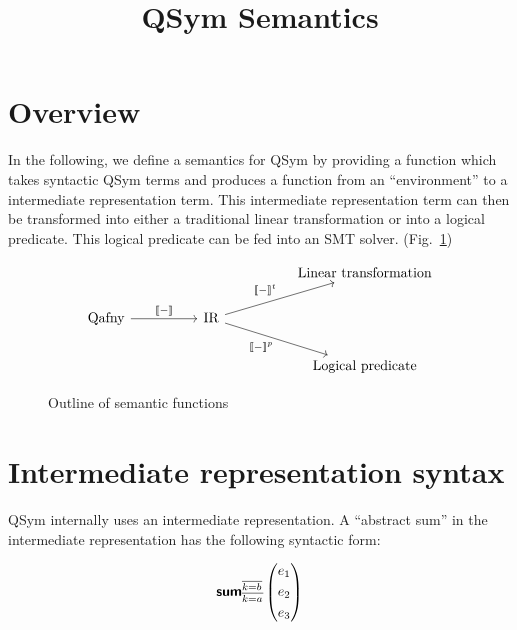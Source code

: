 \documentclass[runningheads]{llncs}
\newcommand {\ir} [1] {\textsf{\textbf{#1}}}
\newcommand {\irSum} {\ir{sum}}
\begin{document}
\title{QSym Semantics}
\author{}
\institute{}
\maketitle

\section{Overview}

In the following, we define a semantics for QSym by providing a function which takes syntactic QSym terms and produces a function from an ``environment'' to a intermediate representation term. This intermediate representation term can then be transformed into either a traditional linear transformation or into a logical predicate. This logical predicate can be fed into an SMT solver. (Fig.~\ref{fig:sem-fns})

\begin{figure}
  \[\begin{tikzcd}
          &&&& {\textnormal{Linear transformation}} \\
          {\textnormal{Qafny}} && {\textnormal{IR}} \\
          &&&& {\textnormal{Logical predicate}}
          \arrow["{\llbracket-\rrbracket}", from=2-1, to=2-3]
          \arrow["{\llbracket-\rrbracket^t}", from=2-3, to=1-5]
          \arrow["{\llbracket-\rrbracket^p}"', from=2-3, to=3-5]
  \end{tikzcd}\]
  \caption{Outline of semantic functions}
  \label{fig:sem-fns}
\end{figure}


\section{Intermediate representation syntax}

QSym internally uses an intermediate representation. A ``abstract sum'' in the intermediate representation has the following syntactic form:

\[
  \irSum_{\overline{k=a}}^{\overline{k=b}}
    \left(\begin{aligned}
      &e_1\\
      &e_2\\
      &e_3
    \end{aligned}\right)
\]
\end{document}

